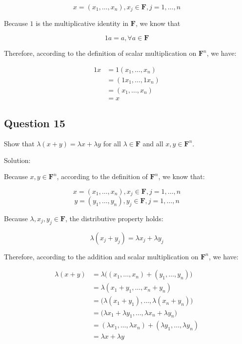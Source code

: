 \documentclass[12pt, letterpaper, oneside]{book}
\begin{document}
\[ x = (x_1, \ldots, x_n), x_j \in \mathbf{F}, j = 1, \ldots, n \]

Because $1$ is the multiplicative identity in $\mathbf{F}$, we know that

\[ 1a = a, \forall a \in \mathbf{F} \]

Therefore, according to the definition of scalar multiplication on
$\mathbf{F}^n$, we have:

\begin{equation*}
  \begin{split}
    1x
    & = 1(x_1, \ldots, x_n) \\
    & = (1 x_1, \ldots, 1 x_n) \\
    & = (x_1, \ldots, x_n) \\
    & = x
  \end{split}
\end{equation*}

\subsection{Question 15}

Show that $\lambda(x + y) = \lambda x + \lambda y$ for all $\lambda \in
  \mathbf{F}$ and all $x, y \in \mathbf{F}^n$.

Solution:

Because $x, y \in \mathbf{F}^n$, according to the definition of $\mathbf{F}^n$,
we know that:

\[ x = (x_1, \ldots, x_n), x_j \in \mathbf{F}, j = 1, \ldots, n \]
\[ y = (y_1, \ldots, y_n), y_j \in \mathbf{F}, j = 1, \ldots, n \]

Because $\lambda, x_j, y_j \in \mathbf{F}$, the distributive property holds:

\[ \lambda(x_j + y_j) = \lambda x_j + \lambda y_j \]

Therefore, according to the addition and scalar multiplication on
$\mathbf{F}^n$, we have:

\begin{equation*}
  \begin{split}
    \lambda(x + y)
    & = \lambda \bigl((x_1, \ldots, x_n) + (y_1, \ldots, y_n)\bigr) \\
    & = \lambda (x_1 + y_1, \ldots, x_n + y_n) \\
    & = \bigl(\lambda(x_1 + y_1), \ldots, \lambda(x_n + y_n)\bigr) \\
    & = \bigl(\lambda x_1 + \lambda y_1, \ldots,
    \lambda x_n + \lambda y_n\bigr) \\
    & = (\lambda x_1, \ldots, \lambda x_n) +
    (\lambda y_1, \ldots, \lambda y_n) \\
    & = \lambda x + \lambda y
  \end{split}
\end{equation*}
\end{document}
